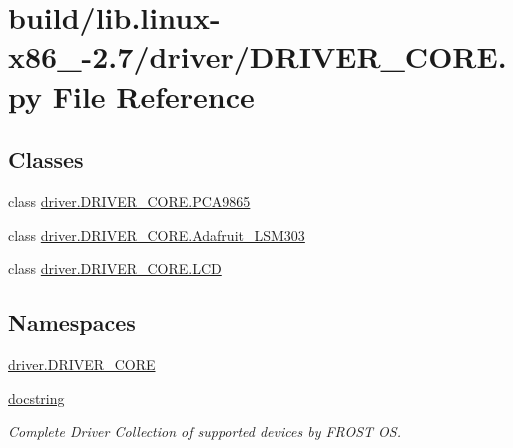 \hypertarget{build_2lib_8linux-x86__64-2_87_2driver_2DRIVER__CORE_8py}{}\section{build/lib.linux-\/x86\+\_-\/2.7/driver/\+D\+R\+I\+V\+E\+R\+\_\+\+C\+O\+R\+E.py File Reference}
\label{build_2lib_8linux-x86__64-2_87_2driver_2DRIVER__CORE_8py}
\subsection*{Classes}
\begin{DoxyCompactItemize}
\item 
class \hyperlink{classdriver_1_1DRIVER__CORE_1_1PCA9865}{driver.\+D\+R\+I\+V\+E\+R\+\_\+\+C\+O\+R\+E.\+P\+C\+A9865}
\item 
class \hyperlink{classdriver_1_1DRIVER__CORE_1_1Adafruit__LSM303}{driver.\+D\+R\+I\+V\+E\+R\+\_\+\+C\+O\+R\+E.\+Adafruit\+\_\+\+L\+S\+M303}
\item 
class \hyperlink{classdriver_1_1DRIVER__CORE_1_1LCD}{driver.\+D\+R\+I\+V\+E\+R\+\_\+\+C\+O\+R\+E.\+L\+C\+D}
\end{DoxyCompactItemize}
\subsection*{Namespaces}
\begin{DoxyCompactItemize}
\item 
 \hyperlink{namespacedriver_1_1DRIVER__CORE}{driver.\+D\+R\+I\+V\+E\+R\+\_\+\+C\+O\+R\+E}
\item 
 \hyperlink{namespacedocstring}{docstring}
\begin{DoxyCompactList}\small\item\em Complete Driver Collection of supported devices by F\+R\+O\+S\+T O\+S. \end{DoxyCompactList}\end{DoxyCompactItemize}
